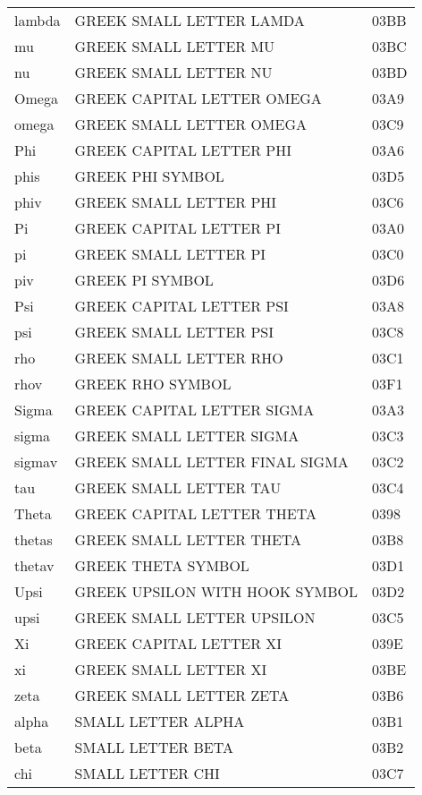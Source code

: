 \begin{latin}
\begin{longtable}{@{}lll}
lambda             & GREEK SMALL LETTER LAMDA            & 03BB\\
mu                 & GREEK SMALL LETTER MU               & 03BC\\
nu                 & GREEK SMALL LETTER NU               & 03BD\\
Omega              & GREEK CAPITAL LETTER OMEGA          & 03A9\\
omega              & GREEK SMALL LETTER OMEGA            & 03C9\\
Phi                & GREEK CAPITAL LETTER PHI            & 03A6\\
phis               & GREEK PHI SYMBOL                    & 03D5\\
phiv               & GREEK SMALL LETTER PHI              & 03C6\\
Pi                 & GREEK CAPITAL LETTER PI             & 03A0\\
pi                 & GREEK SMALL LETTER PI               & 03C0\\
piv                & GREEK PI SYMBOL                     & 03D6\\
Psi                & GREEK CAPITAL LETTER PSI            & 03A8\\
psi                & GREEK SMALL LETTER PSI              & 03C8\\
rho                & GREEK SMALL LETTER RHO              & 03C1\\
rhov               & GREEK RHO SYMBOL                    & 03F1\\
Sigma              & GREEK CAPITAL LETTER SIGMA          & 03A3\\
sigma              & GREEK SMALL LETTER SIGMA            & 03C3\\
sigmav             & GREEK SMALL LETTER FINAL SIGMA      & 03C2\\
tau                & GREEK SMALL LETTER TAU              & 03C4\\
Theta              & GREEK CAPITAL LETTER THETA          & 0398\\
thetas             & GREEK SMALL LETTER THETA            & 03B8\\
thetav             & GREEK THETA SYMBOL                  & 03D1\\
Upsi               & GREEK UPSILON WITH HOOK SYMBOL      & 03D2\\
upsi               & GREEK SMALL LETTER UPSILON          & 03C5\\
Xi                 & GREEK CAPITAL LETTER XI             & 039E\\
xi                 & GREEK SMALL LETTER XI               & 03BE\\
zeta               & GREEK SMALL LETTER ZETA             & 03B6\\
%
%
%
alpha              &  SMALL LETTER ALPHA            & 03B1\\
beta               &  SMALL LETTER BETA             & 03B2\\
chi                &  SMALL LETTER CHI              & 03C7\\


\end{longtable}
\end{latin}
